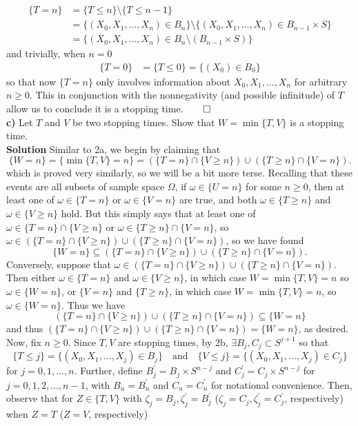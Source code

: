 \documentclass[11pt, letterpaper]{article}
\begin{document}
    \begin{align*}
        \{T=n\}&=\{T\leq n\}\setminus\{T\leq n-1\}\\
        &=\{(X_0,X_1,\dots,X_n)\in B_n\}\setminus\{(X_0,X_1,\dots,X_n)\in B_{n-1}\times S\}\\
        &=\{(X_0,X_1,\dots,X_n)\in B_n\setminus (B_{n-1}\times S)\}
    \end{align*}
    and trivially, when $n=0$
    \begin{align*}
        \{T=0\}&=\{T\leq 0\}=\{(X_0)\in B_0\}
    \end{align*}
    so that now $\{T=n\}$ only involves information about $X_0,X_1,\dots,X_n$ for arbitrary $n\geq 0$. This in conjunction with the nonnegativity (and possible infinitude) of $T$ allow us to conclude it is a stopping time.\hfill{$\qed$}\\[10pt]
    {\bf c)} Let $T$ and $V$ be two stopping times. Show that $W=\min\{T,V\}$ is a stopping time.\\[10pt]
    {\bf Solution} Similar to 2a, we begin by claiming that
    \[\{W=n\}=\{\min\{T,V\}=n\}=\left(\{T=n\}\cap\{V\geq n\}\right)\cup\left(\{T\geq n\}\cap\{V=n\}\right).\]
    which is proved very similarly, so we will be a bit more terse. Recalling that these events are all subsets of sample space $\Omega$, if $\omega\in \{U=n\}$ for some $n\geq 0$, then at least one of $\omega\in\{T=n\}$ or $\omega\in\{V=n\}$ are true, and both $\omega\in\{T\geq n\}$ and $\omega\in\{V\geq n\}$ hold.
    But this simply says that at least one of $\omega\in\{T=n\}\cap\{V\geq n\}$ or $\omega\in\{T\geq n\}\cap\{V=n\}$, so $\omega\in(\{T=n\}\cap\{V\geq n\})\cup(\{T\geq n\}\cap\{V=n\})$, so we have found
    \[\{W=n\}\subseteq (\{T=n\}\cap\{V\geq n\})\cup(\{T\geq n\}\cap\{V=n\}).\]
    Conversely, suppose that $\omega\in(\{T=n\}\cap\{V\geq n\})\cup(\{T\geq n\}\cap\{V=n\})$. Then either $\omega\in\{T=n\}$ and $\omega\in\{V\geq n\}$, in which case $W=\min\{T,V\}=n$ so $\omega\in\{W=n\}$, or $\{V=n\}$ and $\{T\geq n\}$, in which case $W=\min\{T,V\}=n$, so $\omega\in\{W=n\}$. Thus we have
    \[(\{T=n\}\cap\{V\geq n\})\cup(\{T\geq n\}\cap\{V=n\})\subseteq\{W=n\}\]
    and thus $(\{T=n\}\cap\{V\geq n\})\cup(\{T\geq n\}\cap\{V=n\})=\{W=n\}$, as desired.\\[10pt]
    Now, fix $n\geq 0$. Since $T,V$ are stopping times, by 2b, $\exists B_j,C_j\subset S^{j+1}$ so that
    \[\{T\leq j\}=\{(X_0,X_1,\dots,X_j)\in B_j\}\quad\text{and}\quad\{V\leq j\}=\{(X_0,X_1,\dots,X_j)\in C_j\}\]
    for $j=0,1,\dots,n$. Further, define $B_j^\prime=B_j\times S^{n-j}$ and $C_j^\prime=C_j\times S^{n-j}$ for $j=0,1,2,\dots,n-1$, with $B_n=B_n^\prime$ and $C_n=C_n^\prime$ for notational convenience. Then, observe that for $Z\in\{T,V\}$ with $\zeta_j=B_j, \zeta_j^\prime=B_j^\prime$ ($\zeta_j=C_j,\zeta_j^\prime=C_j^\prime$, respectively) when $Z=T$ ($Z=V$, respectively)
\end{document}
